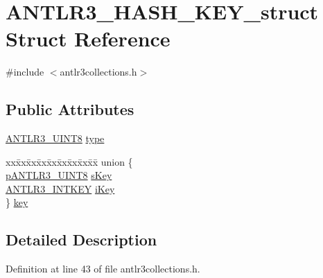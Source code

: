 \hypertarget{struct_a_n_t_l_r3___h_a_s_h___k_e_y__struct}{\section{A\-N\-T\-L\-R3\-\_\-\-H\-A\-S\-H\-\_\-\-K\-E\-Y\-\_\-struct Struct Reference}
\label{struct_a_n_t_l_r3___h_a_s_h___k_e_y__struct}
}


{\ttfamily \#include $<$antlr3collections.\-h$>$}

\subsection*{Public Attributes}
\begin{DoxyCompactItemize}
\item 
\hyperlink{antlr3defs_8h_a785358a47238c5936f6bb88108ebbb7e}{A\-N\-T\-L\-R3\-\_\-\-U\-I\-N\-T8} \hyperlink{struct_a_n_t_l_r3___h_a_s_h___k_e_y__struct_a301b97e69981f8c366b403d90dd67031}{type}
\item 
\begin{tabbing}
xx\=xx\=xx\=xx\=xx\=xx\=xx\=xx\=xx\=\kill
union \{\\
\>\hyperlink{antlr3defs_8h_a95c800abcac5d607fd9e3e775ace78c5}{pANTLR3\_UINT8} \hyperlink{struct_a_n_t_l_r3___h_a_s_h___k_e_y__struct_ac157f365a69982c695eb726d1de875c0}{sKey}\\
\>\hyperlink{antlr3defs_8h_aa5533fd558adc28dc2af0039f52324a8}{ANTLR3\_INTKEY} \hyperlink{struct_a_n_t_l_r3___h_a_s_h___k_e_y__struct_a128b876b88123fe3f785b1e2950cd8d2}{iKey}\\
\} \hyperlink{struct_a_n_t_l_r3___h_a_s_h___k_e_y__struct_ae58efccfcd535db8451f291a7deefd8a}{key}\\

\end{tabbing}\end{DoxyCompactItemize}


\subsection{Detailed Description}


Definition at line 43 of file antlr3collections.\-h.



